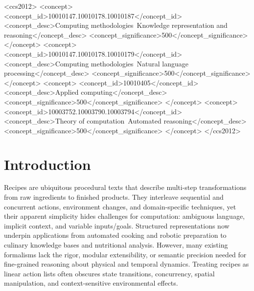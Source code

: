 \documentclass[sigconf]{acmart}
\begin{document}
\begin{CCSXML}
<ccs2012>
   <concept>
       <concept_id>10010147.10010178.10010187</concept_id>
       <concept_desc>Computing methodologies~Knowledge representation and reasoning</concept_desc>
       <concept_significance>500</concept_significance>
       </concept>
   <concept>
       <concept_id>10010147.10010178.10010179</concept_id>
       <concept_desc>Computing methodologies~Natural language processing</concept_desc>
       <concept_significance>500</concept_significance>
       </concept>
   <concept>
       <concept_id>10010405</concept_id>
       <concept_desc>Applied computing</concept_desc>
       <concept_significance>500</concept_significance>
       </concept>
   <concept>
       <concept_id>10003752.10003790.10003794</concept_id>
       <concept_desc>Theory of computation~Automated reasoning</concept_desc>
       <concept_significance>500</concept_significance>
       </concept>
 </ccs2012>
\end{CCSXML}




\maketitle

\section{Introduction}

Recipes are ubiquitous procedural texts that describe multi-step transformations from raw ingredients to finished products. They interleave sequential and concurrent actions, environment changes, and domain-specific techniques, yet their apparent simplicity hides challenges for computation: ambiguous language, implicit context, and variable inputs/goals. Structured representations now underpin applications from automated cooking and robotic preparation to culinary knowledge bases and nutritional analysis. However, many existing formalisms lack the rigor, modular extensibility, or semantic precision needed for fine-grained reasoning about physical and temporal dynamics. Treating recipes as linear action lists often obscures state transitions, concurrency, spatial manipulation, and context-sensitive environmental effects.
\end{document}

